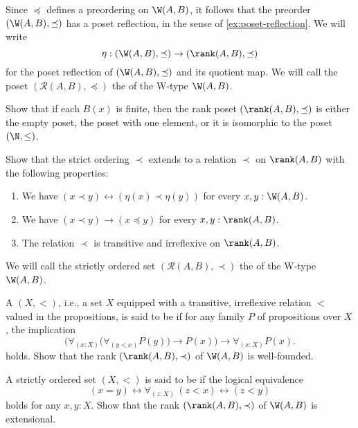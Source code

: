 \begin{exercises}
  Since $\preceq$ defines a preordering on $\W(A,B)$, it follows that the preorder $(\W(A,B),\preceq)$ has a poset reflection, in the sense of \cref{ex:poset-reflection}. We will write
  \begin{equation*}
    \eta : (\W(A,B),\preceq)\to(\rank(A,B),\preceq)
  \end{equation*}
  for the poset reflection of $(\W(A,B),\preceq)$ and its quotient map. We will call the poset $(\mathcal{R}(A,B),\preceq)$ the  of the W-type $\W(A,B)$.
  \begin{subexenum}[resume]
  \item Show that if each $B(x)$ is finite, then the rank poset $(\rank(A,B),\preceq)$ is either the empty poset, the poset with one element, or it is isomorphic to the poset $(\N,\leq)$. 
  \item Show that the strict ordering $\prec$ extends to a relation $\prec$ on $\rank(A,B)$ with the following properties:
    \begin{enumerate}
    \item We have $(x\prec y)\leftrightarrow (\eta(x)\prec\eta(y))$ for every $x,y:\W(A,B)$.
    \item We have $(x\prec y)\to (x\preceq y)$ for every $x,y:\rank(A,B)$.
    \item The relation $\prec$ is transitive and irreflexive on $\rank(A,B)$.
    \end{enumerate}
    We will call the strictly ordered set $(\mathcal{R}(A,B),\prec)$ the  of the W-type $\W(A,B)$. 
  \item A  $(X,<)$, i.e., a set $X$ equipped with a transitive, irreflexive relation $<$ valued in the propositions, is said to be  if for any family $P$ of propositions over $X$, the implication
  \begin{equation*}
    \Big(\forall_{(x:X)}\Big(\forall_{(y<x)}P(y)\Big)\to P(x)\Big)\to \forall_{(x:X)}P(x).
  \end{equation*}
  holds. Show that the rank $(\rank(A,B),\prec)$ of $\W(A,B)$ is well-founded.
  \item A strictly ordered set $(X,<)$ is said to be  if the logical equivalence
  \begin{equation*}
    (x=y)\leftrightarrow\forall_{(z:X)}\,(z<x)\leftrightarrow(z<y)
  \end{equation*}
  holds for any $x,y:X$. Show that the rank $(\rank(A,B),\prec)$ of $\W(A,B)$ is extensional.
  \end{subexenum}
\end{exercises}



